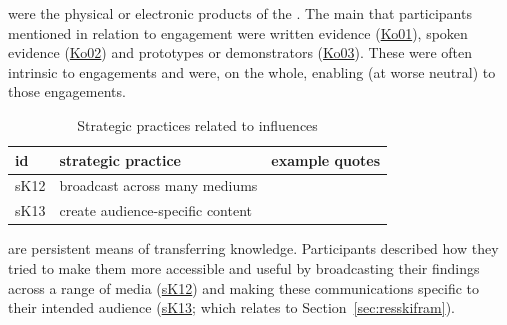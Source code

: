 \skiobje{} were the physical or electronic products of the \skiknow. The main \skiobje{} that participants mentioned in relation to \SPI{} engagement were written evidence (\hyperref[tab:resskiobje]{Ko01}), spoken evidence (\hyperref[tab:resskiobje]{Ko02}) and prototypes or demonstrators (\hyperref[tab:resskiobje]{Ko03}). These \skiobje{} were often intrinsic to engagements and were, on the whole, enabling (at worse neutral) to those engagements.

\begin{table}[!ht]
\footnotesize
\caption{Strategic practices related to \skiobje{} influences}\label{tab:resskiobjestrat}
\begin{tabular}{L{.06\linewidth}L{.3\linewidth}L{.64\linewidth}} \hline
\textbf{id} & \textbf{strategic practice} & \textbf{example quotes} \\ \hline \hline
sK12 & broadcast across many mediums & 
\vfill {} \\
sK13 & create audience-specific content & 
\vfill {} \\
\hline
 \end{tabular}
\end{table}

\skiobje{} are persistent means of transferring knowledge. Participants described how they tried to make them more accessible and useful by broadcasting their findings across a range of media (\hyperref[tab:resskiobjestrat]{sK12}) and making these communications specific to their intended audience (\hyperref[tab:resskiobjestrat]{sK13}; which relates to \skifram{} Section~\ref{sec:resskifram}).

\section{\titscip}\label{sec:resskiscip}

